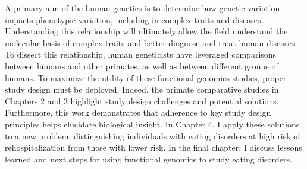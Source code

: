 \abstract
A primary aim of the human genetics is to determine how genetic variation impacts phenotypic variation, including in complex traits and diseases. Understanding this relationship will ultimately allow the field understand the molecular basis of complex traits and better diagnose and treat human diseases. To dissect this relationship, human geneticists have leveraged comparisons between humans and other primates, as well as between different groups of humans. To maximize the utility of these functional genomics studies, proper study design must be deployed. Indeed, the primate comparative studies in Chapters 2 and 3 highlight study design challenges and potential solutions. Furthermore, this work demonstrates that adherence to key study design principles helps elucidate biological insight. In Chapter 4, I apply these solutions to a new problem, distinguishing individuals with eating disorders at high risk of rehospitalization from those with lower risk. In the final chapter, I discuss lessons learned and next steps for using functional genomics to study eating disorders.
